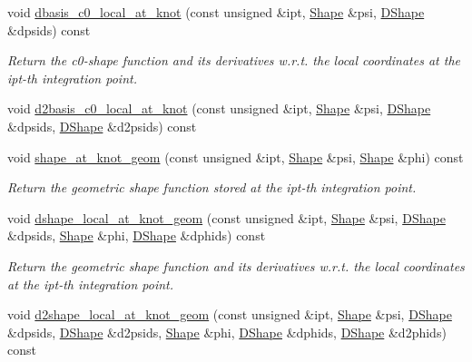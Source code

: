 \begin{DoxyCompactItemize}
void \hyperlink{classoomph_1_1C1CurvedElementBase_a3c986f9ab0c04b4d7a8ca2ae39c37902}{dbasis\+\_\+c0\+\_\+local\+\_\+at\+\_\+knot} (const unsigned \&ipt, \hyperlink{classoomph_1_1Shape}{Shape} \&psi, \hyperlink{classoomph_1_1DShape}{D\+Shape} \&dpsids) const
\begin{DoxyCompactList}\small\item\em Return the c0-\/shape function and its derivatives w.\+r.\+t. the local coordinates at the ipt-\/th integration point. \end{DoxyCompactList}\item 
void \hyperlink{classoomph_1_1C1CurvedElementBase_a77dd032b44618de5e12187e88a1c7007}{d2basis\+\_\+c0\+\_\+local\+\_\+at\+\_\+knot} (const unsigned \&ipt, \hyperlink{classoomph_1_1Shape}{Shape} \&psi, \hyperlink{classoomph_1_1DShape}{D\+Shape} \&dpsids, \hyperlink{classoomph_1_1DShape}{D\+Shape} \&d2psids) const
\item 
void \hyperlink{classoomph_1_1C1CurvedElementBase_a297ab604e37d625a8d78f9411326650b}{shape\+\_\+at\+\_\+knot\+\_\+geom} (const unsigned \&ipt, \hyperlink{classoomph_1_1Shape}{Shape} \&psi, \hyperlink{classoomph_1_1Shape}{Shape} \&phi) const
\begin{DoxyCompactList}\small\item\em Return the geometric shape function stored at the ipt-\/th integration point. \end{DoxyCompactList}\item 
void \hyperlink{classoomph_1_1C1CurvedElementBase_a2cd586d0a06b6dcff44487da273b3642}{dshape\+\_\+local\+\_\+at\+\_\+knot\+\_\+geom} (const unsigned \&ipt, \hyperlink{classoomph_1_1Shape}{Shape} \&psi, \hyperlink{classoomph_1_1DShape}{D\+Shape} \&dpsids, \hyperlink{classoomph_1_1Shape}{Shape} \&phi, \hyperlink{classoomph_1_1DShape}{D\+Shape} \&dphids) const
\begin{DoxyCompactList}\small\item\em Return the geometric shape function and its derivatives w.\+r.\+t. the local coordinates at the ipt-\/th integration point. \end{DoxyCompactList}\item 
void \hyperlink{classoomph_1_1C1CurvedElementBase_afa7d51d3ec5a690371ee392a0ec98ba9}{d2shape\+\_\+local\+\_\+at\+\_\+knot\+\_\+geom} (const unsigned \&ipt, \hyperlink{classoomph_1_1Shape}{Shape} \&psi, \hyperlink{classoomph_1_1DShape}{D\+Shape} \&dpsids, \hyperlink{classoomph_1_1DShape}{D\+Shape} \&d2psids, \hyperlink{classoomph_1_1Shape}{Shape} \&phi, \hyperlink{classoomph_1_1DShape}{D\+Shape} \&dphids, \hyperlink{classoomph_1_1DShape}{D\+Shape} \&d2phids) const

\end{DoxyCompactItemize}
